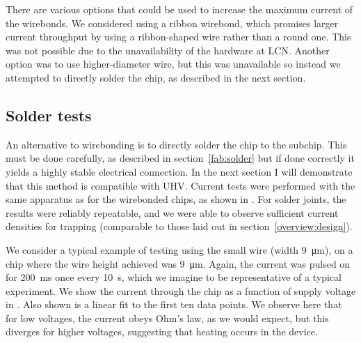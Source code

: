 There are various options that could be used to increase the maximum current of
the wirebonds.  We considered using a ribbon wirebond, which promises larger
current throughput by using a ribbon-shaped wire rather than a round one.  This
was not possible due to the unavailability of the hardware at LCN.  Another
option was to use higher-diameter wire, but this was unavailable so  instead we
attempted to directly solder the chip, as described in the next section.

\subsection{Solder tests}

An alternative to wirebonding is to directly solder the chip to the subchip.
This must be done carefully, as described in section~\ref{fab:solder} but if
done correctly it yields a highly stable electrical connection. In the next
section I will demonstrate that this method is compatible with UHV. Current
tests were performed with the same apparatus as for the wirebonded chips, as
shown in . For solder joints, the results were
reliably repeatable, and we were able to observe sufficient current densities
for trapping (comparable to those laid out in section~\ref{overview:design}).

We consider a typical example of testing using the small wire
(width \SI{9}{\micro\meter}), on a chip where the wire height achieved was
\SI{9}{\micro\meter}. Again, the current was pulsed on for
\SI{200}{\milli\second} once every \SI{10}{\second}, which we imagine to be
representative of a typical experiment. We show the current through the chip as
a function of supply voltage in . Also shown
is a linear fit to the first ten data points. We observe here that for low
voltages, the current obeys Ohm's law, as we would expect, but this diverges
for higher voltages, suggesting that heating occurs in the device.

